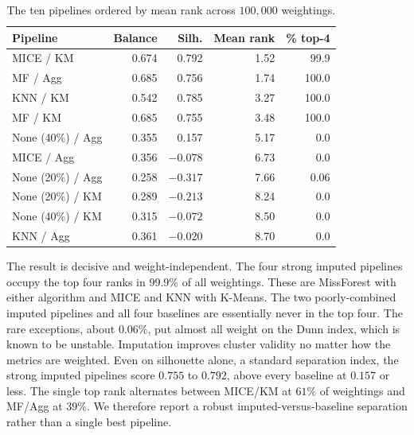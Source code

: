 \documentclass[conference]{IEEEtran}
\begin{document}
\begin{table}[t]
\centering
\caption{The ten pipelines ordered by mean rank across $100{,}000$ weightings.}
\label{tbl:rankdist}
\renewcommand{\arraystretch}{1.1}
\begin{tabular}{lrrrr}
\toprule
\textbf{Pipeline} & \textbf{Balance} & \textbf{Silh.} & \textbf{Mean rank} & \textbf{\% top-4} \\
\midrule
MICE / KM         & 0.674 & \phantom{$-$}0.792 & 1.52 & \phantom{0}99.9 \\
MF / Agg          & 0.685 & \phantom{$-$}0.756 & 1.74 & 100.0 \\
KNN / KM          & 0.542 & \phantom{$-$}0.785 & 3.27 & 100.0 \\
MF / KM           & 0.685 & \phantom{$-$}0.755 & 3.48 & 100.0 \\
\midrule
None (40\%) / Agg & 0.355 & \phantom{$-$}0.157 & 5.17 & \phantom{00}0.0 \\
MICE / Agg        & 0.356 & $-0.078$ & 6.73 & \phantom{00}0.0 \\
None (20\%) / Agg & 0.258 & $-0.317$ & 7.66 & \phantom{0}0.06 \\
None (20\%) / KM  & 0.289 & $-0.213$ & 8.24 & \phantom{00}0.0 \\
None (40\%) / KM  & 0.315 & $-0.072$ & 8.50 & \phantom{00}0.0 \\
KNN / Agg         & 0.361 & $-0.020$ & 8.70 & \phantom{00}0.0 \\
\bottomrule
\end{tabular}
\end{table}

The result is decisive and weight-independent. The four strong imputed pipelines occupy the top four ranks in $99.9\%$ of all weightings. These are MissForest with either algorithm and MICE and KNN with K-Means. The two poorly-combined imputed pipelines and all four baselines are essentially never in the top four. The rare exceptions, about $0.06\%$, put almost all weight on the Dunn index, which is known to be unstable. Imputation improves cluster validity no matter how the metrics are weighted. Even on silhouette alone, a standard separation index, the strong imputed pipelines score $0.755$ to $0.792$, above every baseline at $0.157$ or less. The single top rank alternates between MICE/KM at $61\%$ of weightings and MF/Agg at $39\%$. We therefore report a robust imputed-versus-baseline separation rather than a single best pipeline.
\end{document}
